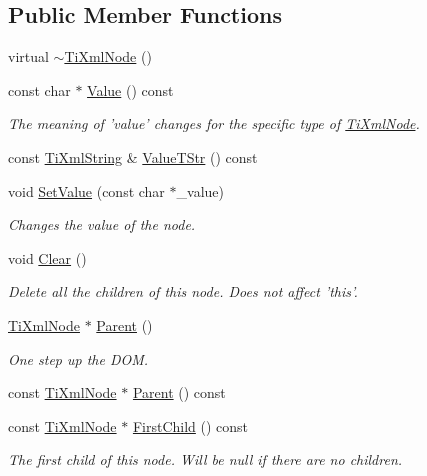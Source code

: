 \subsection*{Public Member Functions}
\begin{DoxyCompactItemize}
\item 
virtual \hyperlink{class_ti_xml_node_a027a76cccd359c831ee4024b58c49625}{$\sim$TiXmlNode} ()
\item 
const char $\ast$ \hyperlink{class_ti_xml_node_a77943eb90d12c2892b1337a9f5918b41}{Value} () const 
\begin{DoxyCompactList}\small\item\em The meaning of 'value' changes for the specific type of \hyperlink{class_ti_xml_node}{TiXmlNode}. \end{DoxyCompactList}\item 
const \hyperlink{class_ti_xml_string}{TiXmlString} \& \hyperlink{class_ti_xml_node_a5d846ea1d1d18dc7c68a6b331fb17863}{ValueTStr} () const 
\item 
void \hyperlink{class_ti_xml_node_a2a38329ca5d3f28f98ce932b8299ae90}{SetValue} (const char $\ast$\_\-value)
\begin{DoxyCompactList}\small\item\em Changes the value of the node. \end{DoxyCompactList}\item 
void \hyperlink{class_ti_xml_node_a708e7f953df61d4d2d12f73171550a4b}{Clear} ()
\begin{DoxyCompactList}\small\item\em Delete all the children of this node. Does not affect 'this'. \end{DoxyCompactList}\item 
\hyperlink{class_ti_xml_node}{TiXmlNode} $\ast$ \hyperlink{class_ti_xml_node_ab643043132ffd794f8602685d34a982e}{Parent} ()
\begin{DoxyCompactList}\small\item\em One step up the DOM. \end{DoxyCompactList}\item 
const \hyperlink{class_ti_xml_node}{TiXmlNode} $\ast$ \hyperlink{class_ti_xml_node_a78878709e53066f06eb4fcbcdd3a5260}{Parent} () const 
\item 
const \hyperlink{class_ti_xml_node}{TiXmlNode} $\ast$ \hyperlink{class_ti_xml_node_a44c8eee26bbe2d1b2762038df9dde2f0}{FirstChild} () const 
\begin{DoxyCompactList}\small\item\em The first child of this node. Will be null if there are no children. \end{DoxyCompactList}\item 

\end{DoxyCompactItemize}
